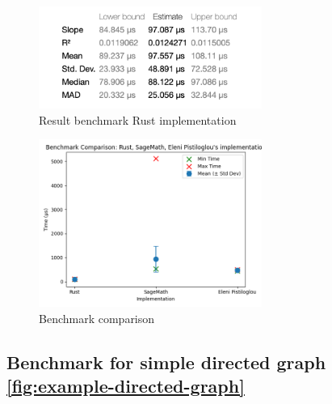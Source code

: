 \begin{figure}[!h]
    \centering
    \includegraphics[width=0.65\textwidth]{images/benchmark/graph_wikipedia/benchmark_graph_wikipedia_rust}
    \caption{Result benchmark Rust implementation}
    \label{fig:benchmark-graph-wikipedia-rust}
\end{figure}

\begin{figure}[!h]
    \centering
    \includegraphics[width=0.65\textwidth]{images/benchmark/graph_wikipedia/benchmark_comparison_graph_wikipedia}
    \caption{Benchmark comparison}
    \label{fig:benchmark-comparison-graph-wikipedia}
\end{figure}

\newpage

\subsection{Benchmark for simple directed graph \ref{fig:example-directed-graph}}\label{subsec:benchmark-for-simple-directed-graph}

